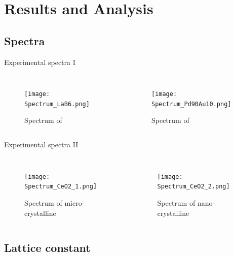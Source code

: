 \documentclass{beamer}
\begin{document}
\section{Results and Analysis}

\subsection{Spectra}

\begin{frame}{Experimental spectra I}
    \begin{columns}
        \begin{figure}
            \centering
            \texttt{[image: Spectrum\_LaB6.png]}
            \caption{Spectrum of }
            \label{fig:SpectrumLaB6}
        \end{figure}
        \begin{figure}
            \centering
            \texttt{[image: Spectrum\_Pd90Au10.png]}
            \caption{Spectrum of }
            \label{fig:SpectrumPd90Au10}
        \end{figure}
    \end{columns}
\end{frame}

\begin{frame}{Experimental spectra II}
    \begin{columns}
        \begin{figure}
            \centering
            \texttt{[image: Spectrum\_CeO2\_1.png]}
            \caption{Spectrum of micro-crystalline }
            \label{fig:SpectrumCeO2_1}
        \end{figure}
        \begin{figure}
            \centering
            \texttt{[image: Spectrum\_CeO2\_2.png]}
            \caption{Spectrum of nano-crystalline }
            \label{fig:SpectrumCeO2_2}
        \end{figure}
    \end{columns}
\end{frame}

\subsection{Lattice constant}
\end{document}
